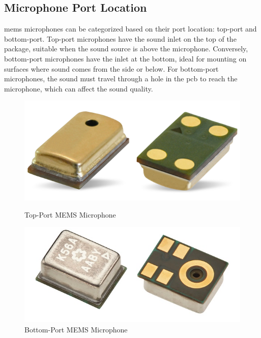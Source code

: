 \subsection{Microphone Port Location}
\acrshort{mems} microphones can be categorized based on their port location: top-port and bottom-port.
Top-port microphones have the sound inlet on the top of the package, suitable when the sound source is above the microphone.
Conversely, bottom-port microphones have the inlet at the bottom, ideal for mounting on surfaces where sound comes from the side or below.
For bottom-port microphones, the sound must travel through a hole in the \acrshort{pcb} to reach the microphone, which can affect the sound quality.
\begin{figure}[h!]
	\centering
	\begin{minipage}{0.49\textwidth}
		\centering
		\includegraphics[width=\textwidth]{images/2_preliminaries/mems_microphone_top.png}
		\caption{Top-Port MEMS Microphone}
		\label{fig:mems_microphone_top}
	\end{minipage}
	\begin{minipage}{0.49\textwidth}
		\centering
		\includegraphics[width=\textwidth]{images/2_preliminaries/mems_microphone_bottom.png}
		\caption{Bottom-Port MEMS Microphone}
		\label{fig:mems_microphone_bottom}
	\end{minipage}
\end{figure}


